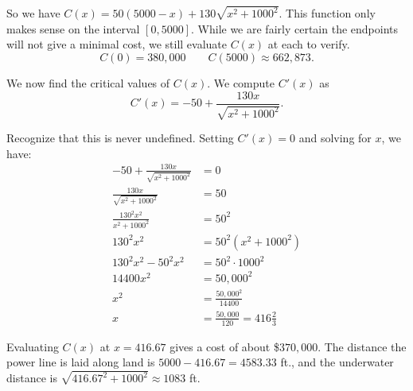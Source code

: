 \begin{example}
So we have $C(x) = 50(5000-x)+ 130\sqrt{x^2+1000^2}$. This function only makes sense on the interval $[0,5000]$. While we are fairly certain the endpoints will not give a minimal cost, we still evaluate $C(x)$ at each to verify.
$$C(0) = 380,000 \quad\quad C(5000) \approx 662,873.$$

We now find the critical values of $C(x)$. We compute $C'(x)$ as 
$$C'(x) = -50+\frac{130x}{\sqrt{x^2+1000^2}}.$$

Recognize that this is never undefined. Setting $C'(x)=0$ and solving for $x$, we have:
\begin{align*}
-50+\frac{130x}{\sqrt{x^2+1000^2}} &= 0 \\
\frac{130x}{\sqrt{x^2+1000^2}}  &= 50\\
\frac{130^2x^2}{x^2+1000^2} &= 50^2\\
130^2x^2 &= 50^2(x^2+1000^2) \\
130^2x^2-50^2x^2 &= 50^2\cdot1000^2\\
14400 x^2 &= 50,000^2\\
x^2 &= \frac{50,000^2}{14400}\\
x & = \frac{50,000}{120} =416\frac23
\end{align*}

Evaluating $C(x)$ at $x=416.67$ gives a cost of about \$$370,000$. The distance the power line is laid along land is $5000-416.67 = 4583.33$ ft., and the underwater distance is $\sqrt{416.67^2+1000^2} \approx 1083$ ft.

\end{example}